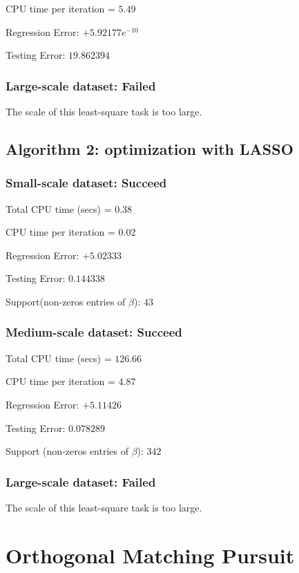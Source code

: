 \documentclass[11pt,a4paper]{report}
\begin{document}
    CPU time per iteration = $5.49$ 

    Regression Error: $+5.92177e^{-10}$
    
    Testing Error: $19.862394$
\subsubsection{Large-scale dataset: Failed}
    
    The scale of this least-square task is too large. 
\subsection{Algorithm 2: optimization with LASSO}
\subsubsection{Small-scale dataset: Succeed}
\hspace{0.47cm}
    Total CPU time (secs)  = $0.38$ 

    CPU time per iteration = $0.02$  

    Regression Error: $+5.02333$

    Testing Error: $0.144338$

    Support(non-zeros entries of $\beta$): $43$

\subsubsection{Medium-scale dataset: Succeed}
\hspace{0.47cm}
    Total CPU time (secs)  = $126.66$

    CPU time per iteration = $4.87$  

    Regression Error: $+5.11426$
 
    Testing Error: $0.078289$

    Support (non-zeros entries of $\beta$): $342$

\subsubsection{Large-scale dataset: Failed}
    
    The scale of this least-square task is too large. 

\section{Orthogonal Matching Pursuit}
\end{document}
